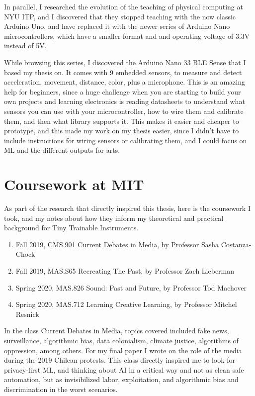 In parallel, I researched the evolution of the teaching of physical computing at \acrshort{NYU} \acrshort{ITP}, and I discovered that they stopped teaching with the now classic Arduino Uno, and have replaced it with the newer series of Arduino Nano microcontrollers, which have a smaller format and and operating voltage of 3.3V instead of 5V.

While browsing this series, I discovered the Arduino Nano 33 \acrshort{BLE} Sense that I based my thesis on. It comes with 9 embedded sensors, to measure and detect acceleration, movement, distance, color, plus a microphone. This is an amazing help for beginners, since a huge challenge when you are starting to build your own projects and learning electronics is reading datasheets to understand what sensors you can use with your microcontroller, how to wire them and calibrate them, and then what library supports it. This makes it easier and cheaper to prototype, and this made my work on my thesis easier, since I didn't have to include instructions for wiring sensors or calibrating them, and I could focus on \acrshort{ML} and the different outputs for arts.

\section{Coursework at MIT}

As part of the research that directly inspired this thesis, here is the coursework I took, and my notes about how they inform my theoretical and practical background for Tiny Trainable Instruments.

\begin{enumerate}
  \item Fall 2019, CMS.901 Current Debates in Media, by Professor Sasha Costanza-Chock
  \item Fall 2019, MAS.S65 Recreating The Past, by Professor Zach Lieberman
  \item Spring 2020, MAS.826 Sound: Past and Future, by Professor Tod Machover
  \item Spring 2020, MAS.712 Learning Creative Learning, by Professor Mitchel Resnick
\end{enumerate}

In the class Current Debates in Media, topics covered included fake news, surveillance, algorithmic bias, data colonialism, climate justice, algorithms of oppression, among others. For my final paper I wrote on the role of the media during the 2019 Chilean protests. This class directly inspired me to look for privacy-first \acrshort{ML}, and thinking about \acrshort{AI} in a critical way and not as clean safe automation, but as invisibilized labor, exploitation, and algorithmic bias and discrimination in the worst scenarios.

